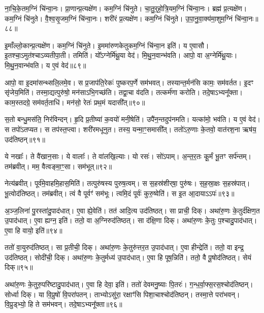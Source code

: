 ना॒चि॒के॒तम॒ग्निं चि॑न्वा॒नः। 
प्रा॒णान्प्र॒त्यक्षे॑ण। कम॒ग्निं चि॑नुते। चा॒तु॒र्॒‌हो॒त्रि॒य\-म॒ग्निं चि॑न्वा॒नः। 
ब्रह्म॑ प्र॒त्यक्षे॑ण। कम॒ग्निं चि॑नुते। वै॒श्व॒सृ॒जम॒ग्निं चि॑न्वा॒नः। 
शरी॑रं प्र॒त्यक्षे॑ण। कम॒ग्निं चि॑नुते। उ॒पा॒नु॒वा॒क्य॑\-मा॒शुम॒ग्निं चि॑न्वा॒नः॥८८॥\ip


इ॒माँल्लो॒कान्प्र॒त्यक्षे॑ण। कम॒ग्निं चि॑नुते। 
इ॒ममा॑रुणकेतुकम॒ग्निं चि॑न्वा॒न इति॑। य ए॒वासौ। 
इ॒तश्चा॒\-ऽमुत॑श्चा\-ऽव्यतीपा॒ती। तमिति॑। 
यो᳚\-ऽग्नेर्मि॑थू॒या वेद॑। मि॒थु॒न॒वान्भ॑वति। 
आपो॒ वा अ॒ग्नेर्मि॑थू॒याः। मि॒थु॒न॒वान्भ॑वति। य ए॒वं वेद॑॥८९॥\ip\anuvakamend


आपो॒ वा इ॒दमा॑सन्थ्सलि॒लमे॒व। स प्र॒जाप॑ति॒रेकः॑ पुष्करप॒र्णे सम॑भवत्। 
तस्यान्त॒र्मन॑सि कामः॒ सम॑वर्तत। इ॒दꣳ सृ॑जेय॒मिति॑। 
तस्मा॒द्यत्पुरु॑षो॒ मन॑सा\-ऽभि॒गच्छ॑ति। तद्वा॒चा व॑दति। 
तत्कर्म॑णा करोति। तदे॒षा\-ऽभ्यनू᳚क्ता। 
काम॒स्तदग्रे॒ सम॑वर्त॒ताधि॑। मन॑सो॒ रेतः॑ प्रथ॒मं यदासी᳚त्॥९०॥\ip


स॒तो बन्धु॒मस॑ति॒ निर॑विन्दन्। हृ॒दि प्र॒तीष्या॑ क॒वयो॑ मनी॒षेति॑। 
उपै॑न॒न्तदुप॑नमति। यत्का॑मो॒ भव॑ति। य ए॒वं वेद॑। 
स तपो॑\-ऽतप्यत। स तप॑स्त॒प्त्वा। शरी॑रमधूनुत। तस्य॒ यन्मा॒ꣳ॒समासी᳚त्। 
ततो॑\-ऽरु॒णाः के॒तवो॒ वात॑रश॒ना ऋष॑य॒ उद॑तिष्ठन्॥९१॥\ip


ये नखाः᳚। ते वै॑खान॒साः। ये वालाः᳚। ते वा॑लखि॒ल्याः। 
यो रसः॑। सो॑\-ऽपाम्। अ॒न्त॒र॒तः कू॒र्मं भू॒तꣳ सर्प॑न्तम्। 
तम॑ब्रवीत्। मम॒ वैत्वङ्मा॒ꣳ॒सा। सम॑भूत्॥९२॥\ip


नेत्य॑ब्रवीत्। पूर्व॑मे॒वाहमि॒हास॒मिति॑। 
तत्पुरु॑षस्य पुरुष॒त्वम्। स स॒हस्र॑शीर्‌षा॒ पुरु॑षः। 
स॒ह॒स्रा॒क्षः स॒हस्र॑पात्। भू॒त्वोद॑तिष्ठत्। 
तम॑ब्रवीत्। त्वं वै पूर्वꣳ॑ सम॑भूः। 
त्वमि॒दं पूर्वः॑ कुरु॒ष्वेति॑। स इ॒त आ॒दाया\-ऽऽपः॑॥९३॥\ip


अ॒ञ्ज॒लिना॑ पु॒रस्ता॑दु॒पाद॑धात्। ए॒वा ह्ये॒वेति॑। 
तत॑ आदि॒त्य उद॑तिष्ठत्। सा प्राची॒ दिक्। 
अथा॑रु॒णः के॒तुर्द॑क्षिण॒त उ॒पाद॑धात्। 
ए॒वा ह्यग्न॒ इति॑। ततो॒ वा अ॒ग्निरुद॑तिष्ठत्। 
सा द॑क्षि॒णा दिक्। अथा॑रु॒णः के॒तुः प॒श्चादु॒पाद॑धात्। 
ए॒वा हि वायो॒ इति॑॥९४॥\ip


ततो॑ वा॒युरुद॑तिष्ठत्। सा प्र॒तीची॒ दिक्। 
अथा॑रु॒णः के॒तुरु॑त्तर॒त उ॒पाद॑धात्। ए॒वा हीन्द्रेति॑। 
ततो॒ वा इन्द्र॒ उद॑तिष्ठत्। सोदी॑ची॒ दिक्। 
अथा॑रु॒णः के॒तुर्मध्य॑ उ॒पाद॑धात्। ए॒वा हि पूष॒न्निति॑। 
ततो॒ वै पू॒षोद॑तिष्ठत्। सेयं दिक्॥९५॥\ip


अथा॑रु॒णः के॒तुरु॒परि॑ष्टादु॒पाद॑धात्। ए॒वा हि देवा॒ इति॑। 
ततो॑ देवमनु॒ष्याः पि॒तरः॑। ग॒न्ध॒र्वा॒फ्स॒रस॒\-श्चोद॑\-तिष्ठन्। 
सोर्ध्वा दिक्। या वि॒प्रुषो॑ वि॒परा॑पतन्। 
ताभ्यो\-ऽसु॑रा॒ रक्षाꣳ॑सि पिशा॒चाश्चोद॑तिष्ठन्। तस्मा॒त्ते परा॑भवन्। 
वि॒प्रुड्भ्यो॒ हि ते सम॑भवन्। तदे॒षा\-ऽभ्यनू᳚क्ता॥९६॥\ip


